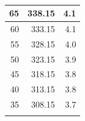 \begin{longtable}{|r|r|r|}
			65                                                                                                      & 338.15                                                                                                 & 4.1                                                                                                  \\ \hline
			60                                                                                                      & 333.15                                                                                                 & 4.1                                                                                                  \\ \hline
			55                                                                                                      & 328.15                                                                                                 & 4.0                                                                                                  \\ \hline
			50                                                                                                      & 323.15                                                                                                 & 3.9                                                                                                  \\ \hline
			45                                                                                                      & 318.15                                                                                                 & 3.8                                                                                                  \\ \hline
			40                                                                                                      & 313.15                                                                                                 & 3.8                                                                                                  \\ \hline
			35                                                                                                      & 308.15                                                                                                 & 3.7                                                                                                  \\ \hline
			\caption{}
			\label{tab:fermi-obs}
		\end{longtable}
	
